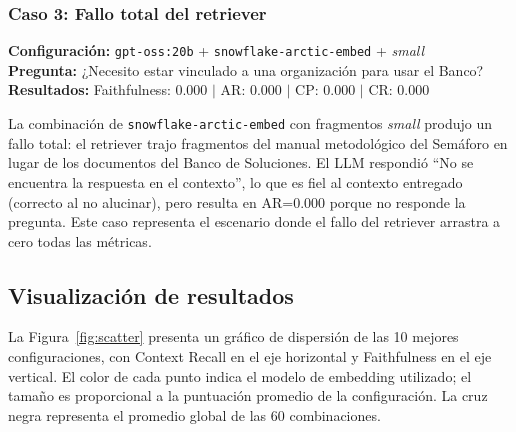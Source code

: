 \documentclass{article}
\begin{document}
\subsubsection*{Caso 3: Fallo total del retriever}

\noindent \textbf{Configuración:} \texttt{gpt-oss:20b} + \texttt{snowflake-arctic-embed} + \textit{small} \\
\textbf{Pregunta:} ¿Necesito estar vinculado a una organización para usar el Banco? \\
\textbf{Resultados:} Faithfulness: 0.000 $|$ AR: 0.000 $|$ CP: 0.000 $|$ CR: 0.000

\noindent La combinación de \texttt{snowflake-arctic-embed} con fragmentos
\textit{small} produjo un fallo total: el retriever trajo fragmentos del manual
metodológico del Semáforo en lugar de los documentos del Banco de Soluciones.
El LLM respondió ``No se encuentra la respuesta en el contexto'', lo que es
fiel al contexto entregado (correcto al no alucinar), pero resulta en AR=0.000
porque no responde la pregunta. Este caso representa el escenario donde el fallo
del retriever arrastra a cero todas las métricas.

\subsection{Visualización de resultados}

La Figura~\ref{fig:scatter} presenta un gráfico de dispersión de las 10
mejores configuraciones, con Context Recall en el eje horizontal y
Faithfulness en el eje vertical. El color de cada punto indica el modelo de
embedding utilizado; el tamaño es proporcional a la puntuación promedio de
la configuración. La cruz negra representa el promedio global de las 60
combinaciones.
\end{document}

